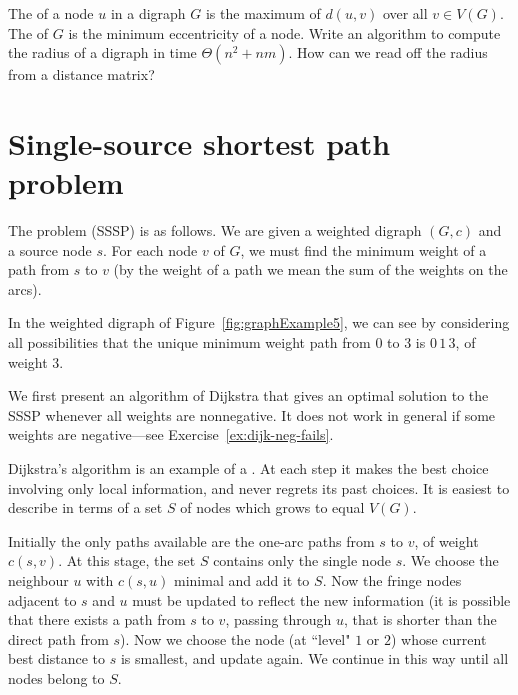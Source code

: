 \begin{Exercise}
\label{ex:radius}
The  of a node $u$ in a  digraph $G$  is the
maximum of $d(u, v)$ over all $v\in V(G)$. The  of $G$
is the minimum eccentricity of a node. Write an
algorithm to compute the radius of a digraph in time $\Theta(n^2 +
nm)$. How can we read off the radius from a distance matrix?
\end{Exercise}

\section{Single-source shortest path problem}
\label{sec:SSSP}

The  problem (SSSP) is as
follows. We are given a weighted digraph $(G, c)$ and a source node
$s$. For each node $v$ of $G$, we must find the minimum weight of a path
from $s$ to $v$ (by the weight of a path we mean the sum of the weights
on the arcs).

\begin{Example}
\label{eg:SSSP}
In the weighted digraph of Figure~\ref{fig:graphExample5}, we can see by
considering all possibilities that the unique minimum weight path from
$0$ to $3$ is $0\, 1\, 3$, of weight $3$.
\end{Example}

We first present an algorithm of Dijkstra that gives an optimal
solution to the SSSP whenever all weights are nonnegative. It
does not work in general if some weights are negative---see
Exercise~\ref{ex:dijk-neg-fails}. 

Dijkstra's algorithm is an example of a . At
each step it makes the best choice involving only local information,
and never regrets its past choices. It is easiest to describe in terms of
a set $S$ of nodes which grows to equal $V(G)$. 

Initially the only paths available are the one-arc paths from $s$ to
$v$, of weight $c(s, v)$. At this stage, the set $S$  contains only the
single node $s$. We choose the neighbour $u$ with $c(s, u)$ minimal and
add it to $S$. Now the fringe nodes adjacent to $s$ and $u$ must be
updated to reflect the new information (it is possible that there
exists a path from $s$ to $v$, passing through $u$, that is shorter
than the direct path from $s$). Now we choose the node (at ``level" $1$
or $2$) whose current best distance to $s$ is smallest, and update
again. We continue in this way until all nodes belong to $S$.

